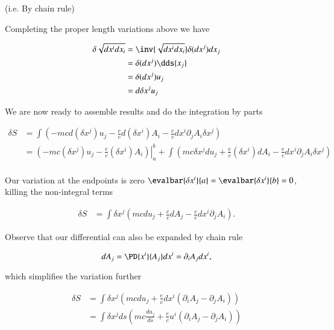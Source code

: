 (i.e. By chain rule)

Completing the proper length variations above we have

\begin{align*}
\delta \sqrt{ dx^i dx_i } 
&= \inv{ \sqrt{ dx^i dx_i }} \delta (dx^j) dx_j \\
&= \delta (dx^j) \dds{x_j}  \\
&= \delta (dx^j) u_j \\
&= d \delta x^j u_j
\end{align*}

We are now ready to assemble results and do the integration by parts

\begin{align*}
\delta S 
&= \int \left( 
-m c d (\delta x^j) u_j
- \frac{e}{c} d (\delta x^i) A_i 
- \frac{e}{c} dx^i \partial_j A_i \delta x^j
\right) \\
&= 
{\left. 
\left( -m c (\delta x^j) u_j - \frac{e}{c} (\delta x^i) A_i \right)
\right\vert}_a^b
+\int \left( 
m c \delta x^j d u_j
+ \frac{e}{c} (\delta x^i) d A_i 
- \frac{e}{c} dx^i \partial_j A_i \delta x^j
\right) \\
\end{align*}

Our variation at the endpoints is zero $\evalbar{\delta x^i}{a} = \evalbar{\delta x^i}{b} = 0$, killing the non-integral terms

\begin{align*}
\delta S 
&= 
\int 
\delta x^j
\left( 
m c d u_j
+ \frac{e}{c} d A_j 
- \frac{e}{c} dx^i \partial_j A_i 
\right).
\end{align*}

Observe that our differential can also be expanded by chain rule

\begin{equation}\label{eqn:relativisticElectrodynamicsL10:330}
d A_j = \PD{x^i}{A_j} dx^i = \partial_i A_j dx^i,
\end{equation}

which simplifies the variation further

\begin{align*}
\delta S 
&= 
\int 
\delta x^j
\left( 
m c d u_j
+ \frac{e}{c} dx^i ( \partial_i A_j - \partial_j A_i )
\right) \\
&= 
\int 
\delta x^j ds
\left( 
m c \frac{d u_j}{ds}
+ \frac{e}{c} u^i ( \partial_i A_j - \partial_j A_i )
\right) \\
\end{align*}

